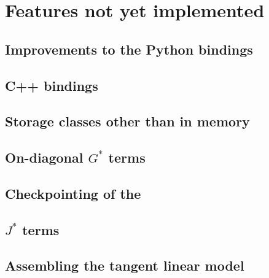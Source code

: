 \chapter{Features not yet implemented}
\section{Improvements to the Python bindings}
\section{C++ bindings}
\section{Storage classes other than in memory}
\section{On-diagonal $G^*$ terms}
\section{Checkpointing of the \adjointer}
\section{$J^*$ terms}
\section{Assembling the tangent linear model}
